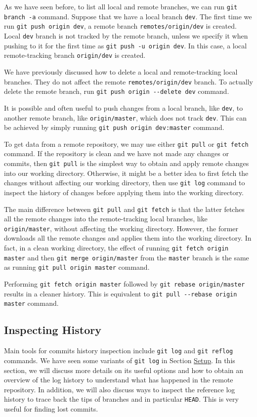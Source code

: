 \documentclass[11pt]{article}
\begin{document}
As we have seen before, to list all local and remote branches, we can run \texttt{git branch -a} command. Suppose that we have a local branch \texttt{dev}. The first time we run \texttt{git push origin dev}, a remote branch \texttt{remotes/origin/dev} is created. Local \texttt{dev} branch is not tracked by the remote branch, unless we specify it when pushing to it for the first time as \texttt{git push -u origin dev}. In this case, a local remote-tracking branch \texttt{origin/dev} is created.

We have previously discussed how to delete a local and remote-tracking local branches. They do not affect the remote \texttt{remotes/origin/dev} branch. To actually delete the remote branch, run \texttt{git push origin -{}-delete dev} command.

It is possible and often useful to push changes from a local branch, like \texttt{dev}, to another remote branch, like \texttt{origin/master}, which does not track \texttt{dev}. This can be achieved by simply running \texttt{git push origin dev:master} command.

To get data from a remote repository, we may use either \texttt{git pull} or \texttt{git fetch} command. If the repository is clean and we have not made any changes or commits, then \texttt{git pull} is the simplest way to obtain and apply remote changes into our working directory. Otherwise, it might be a better idea to first fetch the changes without affecting our working directory, then use \texttt{git log} command to inspect the history of changes before applying them into the working directory.

The main difference between \texttt{git pull} and \texttt{git fetch} is that the latter fetches all the remote changes into the remote-tracking local branches, like \texttt{origin/master}, without affecting the working directory. However, the former downloads all the remote changes and applies them into the working directory. In fact, in a clean working directory, the effect of running \texttt{git fetch origin master} and then \texttt{git merge origin/master} from the \texttt{master} branch is the same as running \texttt{git pull origin master} command.

Performing \texttt{git fetch origin master} followed by \texttt{git rebase origin/master} results in a cleaner history. This is equivalent to \texttt{git pull -{}-rebase origin master} command.

\subsection{Inspecting History}
\label{sec:orgheadline17}
Main tools for commits history inspection include \texttt{git log} and \texttt{git reflog} commands. We have seen some variants of \texttt{git log} in Section \hyperref[orgtarget1]{Setup}. In this section, we will discuss more details on its useful options and how to obtain an overview of the log history to understand what has happened in the remote repository. In addition, we will also discuss ways to inspect the reference log history to trace back the tips of branches and in particular \texttt{HEAD}. This is very useful for finding lost commits.
\end{document}
